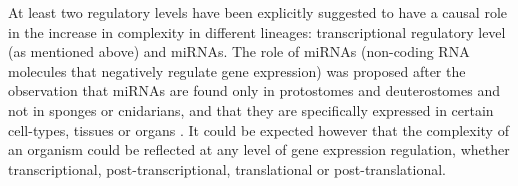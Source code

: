 At least two regulatory levels have been explicitly suggested to have a causal role in the increase in complexity in different lineages:  transcriptional regulatory level (as mentioned above) \citep{Davidson2001} and miRNAs. The role of miRNAs (non-coding RNA molecules that negatively regulate gene expression) was proposed after the observation that miRNAs are found only in protostomes and deuterostomes and not in sponges or cnidarians, and that they are specifically expressed in certain cell-types, tissues or organs \citep{Sempere2006}.
%
It could be expected however that the complexity of an organism could be reflected at any level of gene expression regulation, whether transcriptional, post-transcriptional, translational or post-translational.




